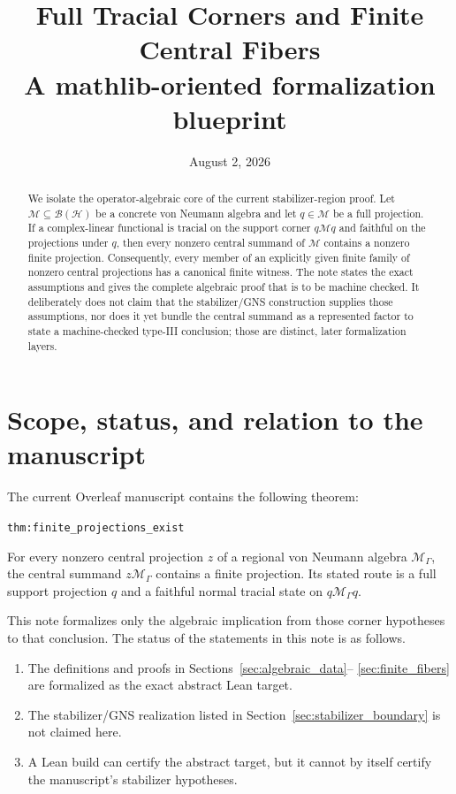 \documentclass[11pt,reqno]{amsart}
\title[Full Tracial Corners]{Full Tracial Corners and Finite Central Fibers\\
\large A mathlib-oriented formalization blueprint}
\author{}
\date{August 2, 2026}
\numberwithin{equation}{section}
\theoremstyle{definition}
\theoremstyle{remark}
\newcommand{\cB}{\mathcal B}
\newcommand{\cH}{\mathcal H}
\newcommand{\cM}{\mathcal M}
\begin{document}
\begin{abstract}
We isolate the operator-algebraic core of the current stabilizer-region proof.
Let $\cM\subseteq\cB(\cH)$ be a concrete von Neumann algebra and let
$q\in\cM$ be a full projection.  If a complex-linear functional is tracial
on the support corner $q\cM q$ and faithful on the projections under $q$,
then every nonzero central summand of $\cM$ contains a nonzero finite
projection.  Consequently, every member of an explicitly given finite family
of nonzero central projections has a canonical finite witness.  The note
states the exact assumptions and gives the complete algebraic proof that is to
be machine checked.  It deliberately does not claim that the stabilizer/GNS
construction supplies those assumptions, nor does it yet bundle the central
summand as a represented factor to state a machine-checked type-III
conclusion; those are distinct, later formalization layers.
\end{abstract}

\maketitle

\section{Scope, status, and relation to the manuscript}

The current Overleaf manuscript contains the following theorem:
\begin{center}
\texttt{thm:finite\_projections\_exist}
\end{center}
For every nonzero central projection $z$ of a regional von Neumann algebra
$\cM_\Gamma$, the central summand $z\cM_\Gamma$ contains a finite projection.
Its stated route is a full support projection $q$ and a faithful normal
tracial state on $q\cM_\Gamma q$.

This note formalizes only the algebraic implication from those corner
hypotheses to that conclusion.  The status of the statements in this note is
as follows.
\begin{enumerate}[label=\textup{(\roman*)},leftmargin=2.5em]
  \item The definitions and proofs in Sections~\ref{sec:algebraic_data}--
  \ref{sec:finite_fibers} are formalized as the exact abstract Lean target.
  \item The stabilizer/GNS realization listed in
  Section~\ref{sec:stabilizer_boundary} is not claimed here.
  \item A Lean build can certify the abstract target, but it cannot by itself
  certify the manuscript's stabilizer hypotheses.
\end{enumerate}
\end{document}
